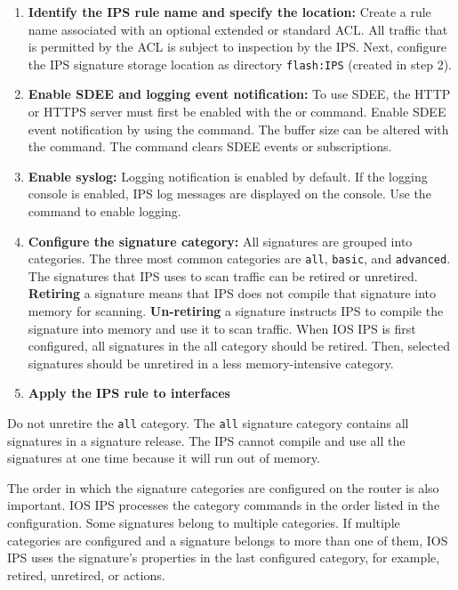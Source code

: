 \begin{enumerate}
\item \textbf{Identify the IPS rule name and specify the location:} Create a rule name associated with an optional extended or standard ACL. All traffic that is permitted by the ACL is subject to inspection by the IPS. Next, configure the IPS signature storage location as directory \verb|flash:IPS| (created in step 2).

\item \textbf{Enable SDEE and logging event notification:} To use SDEE, the HTTP or HTTPS server must first be enabled with the  or  command. Enable SDEE event notification by using the  command. The buffer size can be altered with the  command. The  command clears SDEE events or subscriptions.

\item \textbf{Enable syslog:} Logging notification is enabled by default. If the logging console is enabled, IPS log messages are displayed on the console. Use the  command to enable logging.

\item \textbf{Configure the signature category:} All signatures are grouped into categories. The three most common categories are \verb|all|, \verb|basic|, and \verb|advanced|. The signatures that IPS uses to scan traffic can be retired or unretired. \textbf{Retiring} a signature means that IPS does not compile that signature into memory for scanning. \textbf{Un-retiring} a signature instructs IPS to compile the signature into memory and use it to scan traffic. When IOS IPS is first configured, all signatures in the all category should be retired. Then, selected signatures should be unretired in a less memory-intensive category. 

\item \textbf{Apply the IPS rule to interfaces} 
\end{enumerate}

\note Do not unretire the \verb|all| category. The \verb|all| signature category contains all signatures in a signature release. The IPS cannot compile and use all the signatures at one time because it will run out of memory.

\note The order in which the signature categories are configured on the router is also important. IOS IPS processes the category commands in the order listed in the configuration. Some signatures belong to multiple categories. If multiple categories are configured and a signature belongs to more than one of them, IOS IPS uses the signature’s properties in the last configured category, for example, retired, unretired, or actions.

